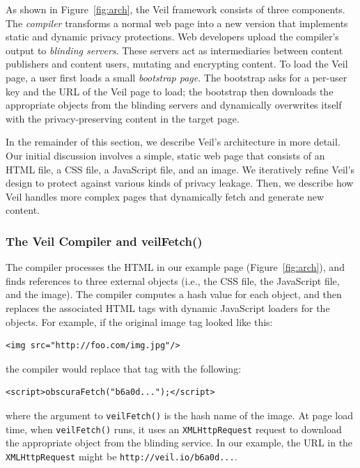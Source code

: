 As shown in Figure~\ref{fig:arch}, the Veil framework  %
consists of three components. The \emph{compiler}
transforms a normal web page into a new version
that implements static and dynamic privacy protections.
Web developers upload the compiler's output to
\emph{blinding servers}. These servers act as
intermediaries between content publishers and
content users, mutating and encrypting content. To load the Veil
page, a user first loads a small \emph{bootstrap page}.
The bootstrap asks for a per-user key and the
URL of the Veil page to load; the bootstrap then
downloads the appropriate objects from the blinding
servers and dynamically overwrites itself with
the privacy-preserving content in the target page.

In the remainder of this section, we describe Veil's
architecture in more detail. Our initial discussion
involves a simple, static web page that consists of
an HTML file, a CSS file, a JavaScript file, and an
image. We iteratively refine Veil's design to protect
against various kinds of privacy leakage. Then, we
describe how Veil handles more complex pages that
dynamically fetch and generate new content.


\subsubsection{The Veil Compiler and veilFetch()}
\label{sec:compiler}

The compiler processes the HTML in our example page (Figure~\ref{fig:arch}),
and finds references to three external objects (i.e.,
the CSS file, the JavaScript file, and the image).
The compiler computes a hash value for each object,
and then replaces the associated HTML tags with
dynamic JavaScript loaders for the objects. For
example, if the original image tag looked like this:
\begin{verbatim}
<img src="http://foo.com/img.jpg"/>
\end{verbatim}
the compiler would replace that tag with the following:
\begin{verbatim}
<script>obscuraFetch("b6a0d...");</script>
\end{verbatim}
where the argument to \texttt{veilFetch()} is the hash
name of the image. At page load time, when
\texttt{veilFetch()} runs, it uses an \texttt{XMLHttpRequest}
request to download the appropriate object from the
blinding service. In our example, the URL in the
\texttt{XMLHttpRequest} might be \texttt{http://veil.io/b6a0d...}.

